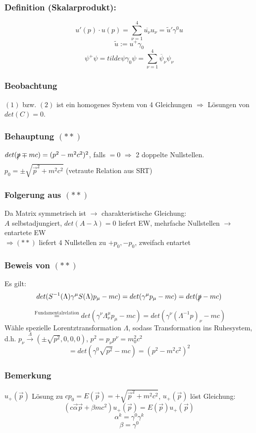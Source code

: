 \documentclass[twoside,a4paper]{scrartcl}
\renewcommand{\1}{\mathds{1}}
\newcommand{\Ra}{\Rightarrow}
\newcommand{\ra}{\rightarrow}
\renewcommand{\l}{\lambda}
\renewcommand{\L}{\Lambda}
\begin{document}
\subsubsection*{Definition (Skalarprodukt):}
$$u'(p) \cdot u(p)=\sum_{\nu=1}^4\overline{u_\nu}u_\nu=\tilde u' \gamma^0 u$$
$$\tilde u:=u^+\gamma_0$$
$$\psi^+\psi=tilde \psi \gamma_0 \psi=\sum_{\nu=1}^4\overline \psi_\nu \psi_\nu$$

\subsubsection*{Beobachtung}
$(1)$ bzw. $(2)$ ist ein homogenes System von 4 Gleichungen $\Ra$ Lösungen von $det(C)=0$.

\subsubsection*{Behauptung $(**)$}
$det(\xout{p} \mp mc)=(p^2- m^2c^2)^2$, falls $=0$ $\Ra$ 2 doppelte Nullstellen.\\
$p_0=\pm\sqrt{\vec p^2+m^2c^2}$ (vetraute Relation aus SRT)

\subsubsection*{Folgerung aus $(**)$}
Da Matrix symmetrisch ist $\ra$ charakteristische Gleichung:\\
$A$ selbstadjungiert, $det(A-\l)=0$ liefert EW, mehrfache Nullstellen $\ra$ entartete EW\\
$\Ra (**)$ liefert 4 Nullstellen zu $+p_0,-p_0$, zweifach entartet

\subsubsection*{Beweis von $(**)$}
Es gilt:
$$det(S^{-1}(\L)\gamma^\mu S(\L) p_\mu-mc)=det(\gamma^\mu p_\mu -mc)=det(\xout{p} -mc)$$
$$\stackrel{\mathrm{Fundamentalrelation}}{=} det(\gamma^\nu \L_\nu^\mu p_\mu-mc)=det(\gamma^\nu(\L^{-1}p)_\nu-mc)$$
Wähle spezielle Lorentztransformation $\L$, sodass Transformation ins Ruhesystem, d.h. $p_\nu \stackrel{\L}{\ra} (\pm \sqrt{p^2},0,0,0)$, $p^2=p_\nu p^\nu=m_0^2c^2$
$$=det(\gamma^0\sqrt{p^2}-mc)=(p^2-m^2c^2)^2$$

\subsubsection*{Bemerkung}
$u_+(\vec p)$ Lösung zu $cp_0=E(\vec p)=+\sqrt{\vec p^2+m^2c^2}$, $u_+(\vec p)$ löst Gleichung: $$(c\vec \alpha \vec p+\beta mc^2)u_+(\vec p)=E(\vec p)u_+(\vec p)$$
$$\alpha^k=\gamma^0\gamma^k$$
$$\beta=\gamma^0$$
\end{document}
